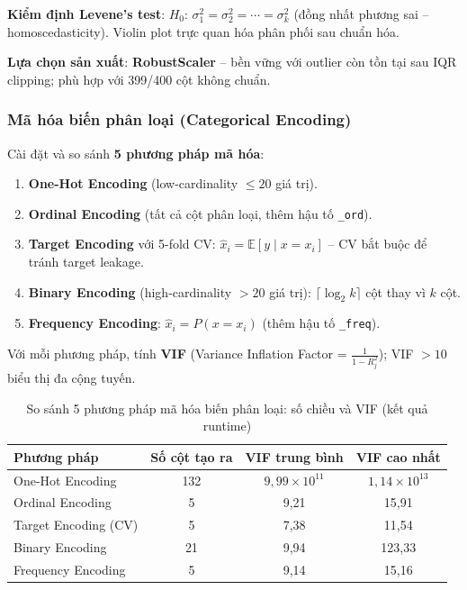 \documentclass[12pt,a4paper]{article}
\let\oldtextbf\textbf
\renewcommand{\textbf}[1]{\oldtextbf{\textcolor{hcmublue}{#1}}}
\begin{document}
\textbf{Kiểm định Levene's test}: $H_0$: $\sigma_1^2 = \sigma_2^2 = \cdots = \sigma_k^2$ (đồng nhất phương sai -- homoscedasticity). Violin plot trực quan hóa phân phối sau chuẩn hóa.

\textbf{Lựa chọn sản xuất}: \textbf{RobustScaler} -- bền vững với outlier còn tồn tại sau IQR clipping; phù hợp với 399/400 cột không chuẩn.

\subsubsection{Mã hóa biến phân loại (Categorical Encoding)}

Cài đặt và so sánh \textbf{5 phương pháp mã hóa}:

\begin{enumerate}
    \item \textbf{One-Hot Encoding} (low-cardinality $\leq 20$ giá trị).
    \item \textbf{Ordinal Encoding} (tất cả cột phân loại, thêm hậu tố \texttt{\_ord}).
    \item \textbf{Target Encoding} với 5-fold CV: $\hat{x}_i = \mathbb{E}[y \mid x = x_i]$ -- CV bắt buộc để tránh target leakage.
    \item \textbf{Binary Encoding} (high-cardinality $> 20$ giá trị): $\lceil\log_2 k\rceil$ cột thay vì $k$ cột.
    \item \textbf{Frequency Encoding}: $\hat{x}_i = P(x = x_i)$ (thêm hậu tố \texttt{\_freq}).
\end{enumerate}

Với mỗi phương pháp, tính \textbf{VIF} (Variance Inflation Factor = $\frac{1}{1 - R_j^2}$); VIF $> 10$ biểu thị đa cộng tuyến.

\begin{table}[H]
\centering
\begin{tabular}{|l|c|c|c|}
\hline
\textbf{Phương pháp} & \textbf{Số cột tạo ra} & \textbf{VIF trung bình} & \textbf{VIF cao nhất} \\ \hline
One-Hot Encoding     & 132 & $9{,}99 \times 10^{11}$ & $1{,}14 \times 10^{13}$ \\ \hline
Ordinal Encoding     & 5   & 9{,}21  & 15{,}91 \\ \hline
Target Encoding (CV) & 5   & 7{,}38  & 11{,}54 \\ \hline
Binary Encoding      & 21  & 9{,}94  & 123{,}33 \\ \hline
Frequency Encoding   & 5   & 9{,}14  & 15{,}16 \\ \hline
\end{tabular}
\caption{So sánh 5 phương pháp mã hóa biến phân loại: số chiều và VIF (kết quả runtime)}
\label{tab:encoding_vif}
\end{table}
\end{document}
